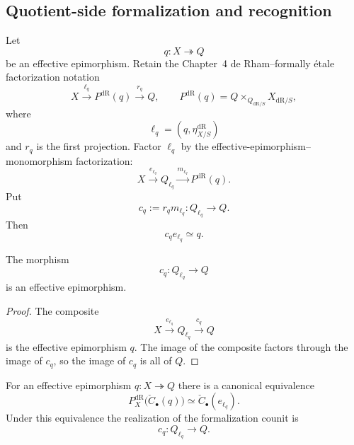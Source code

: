 \subsection{Quotient-side formalization and recognition}

\begin{definition}
\label{def:quotient-formalization}
Let
\[
    q:X\twoheadrightarrow Q
\]
be an effective epimorphism.  Retain the Chapter~4 de Rham--formally
\'etale factorization notation
\[
    X
    \xrightarrow{\ell_q}
    P^{\mathrm{dR}}(q)
    \xrightarrow{r_q}
    Q,
    \qquad
    P^{\mathrm{dR}}(q)
    =
    Q\times_{Q_{\mathrm{dR}/S}}X_{\mathrm{dR}/S},
\]
where
\[
    \ell_q=(q,\eta_{X/S}^{\mathrm{dR}})
\]
and $r_q$ is the first projection.  Factor $\ell_q$ by the
effective-epimorphism--monomorphism factorization:
\[
    X
    \xrightarrow{e_{\ell_q}}
    Q_{\ell_q}
    \xrightarrow{m_{\ell_q}}
    P^{\mathrm{dR}}(q).
\]
Put
\[
    c_q
    :=
    r_qm_{\ell_q}:
    Q_{\ell_q}\longrightarrow Q.
\]
Then
\[
    c_qe_{\ell_q}\simeq q.
\]
\end{definition}

\begin{lemma}
\label{lem:quotient-formalization-effective}
The morphism
\[
    c_q:Q_{\ell_q}\longrightarrow Q
\]
is an effective epimorphism.
\end{lemma}

\begin{proof}
The composite
\[
    X\xrightarrow{e_{\ell_q}}Q_{\ell_q}
      \xrightarrow{c_q}Q
\]
is the effective epimorphism $q$.  The image of the composite factors through
the image of $c_q$, so the image of $c_q$ is all of $Q$.
\end{proof}

\begin{theorem}
\label{thm:quotient-formula-unitwise-formalization}
For an effective epimorphism $q:X\twoheadrightarrow Q$ there is a canonical
equivalence
\[
    P_X^{\mathrm{dR}}\bigl(\check C_\bullet(q)\bigr)
    \simeq
    \check C_\bullet(e_{\ell_q}).
\]
Under this equivalence the realization of the formalization counit is
\[
    c_q:Q_{\ell_q}\longrightarrow Q.
\]
\end{theorem}

